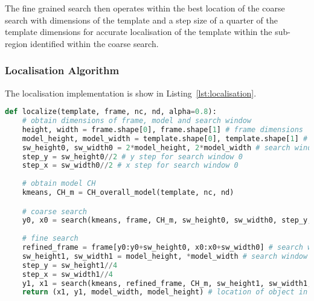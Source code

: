 The fine grained search then operates within the best location of the coarse
search with dimensions of the template and a step size of a quarter of the
template dimensions for accurate localisation of the template within the
sub-region identified within the coarse search.


\subsubsection{Localisation Algorithm}
The localisation implementation is show in Listing~\ref{lst:localisation}.

\begin{lstlisting}[language=Python, caption={Computing candidate CH}, captionpos=b, label={lst:localisation}]
def localize(template, frame, nc, nd, alpha=0.8):
    # obtain dimensions of frame, model and search window
    height, width = frame.shape[0], frame.shape[1] # frame dimensions
    model_height, model_width = template.shape[0], template.shape[1] # model dimensions
    sw_height0, sw_width0 = 2*model_height, 2*model_width # search window dimensions
    step_y = sw_height0//2 # y step for search window 0
    step_x = sw_width0//2 # x step for search window 0
    
    # obtain model CH
    kmeans, CH_m = CH_overall_model(template, nc, nd) 

    # coarse search
    y0, x0 = search(kmeans, frame, CH_m, sw_height0, sw_width0, step_y, step_x, nc, nd, alpha) 
    
    # fine search
    refined_frame = frame[y0:y0+sw_height0, x0:x0+sw_width0] # search within best coarse result
    sw_height1, sw_width1 = model_height, *model_width # search window dimensions
    step_y = sw_height1//4
    step_x = sw_width1//4
    y1, x1 = search(kmeans, refined_frame, CH_m, sw_height1, sw_width1, step_y, step_x, nc, nd, alpha)  
    return (x1, y1, model_width, model_height) # location of object in frame
\end{lstlisting}

